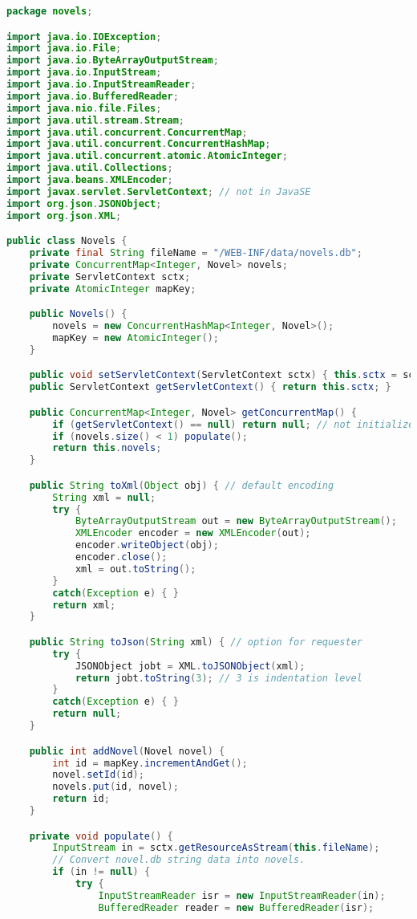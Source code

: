 \documentclass[12pt]{article}
\begin{document}
\begin{lstlisting}[language=java]
package novels;

import java.io.IOException;
import java.io.File;
import java.io.ByteArrayOutputStream;
import java.io.InputStream;
import java.io.InputStreamReader;
import java.io.BufferedReader;
import java.nio.file.Files;
import java.util.stream.Stream;
import java.util.concurrent.ConcurrentMap;
import java.util.concurrent.ConcurrentHashMap;
import java.util.concurrent.atomic.AtomicInteger;
import java.util.Collections;
import java.beans.XMLEncoder;
import javax.servlet.ServletContext; // not in JavaSE
import org.json.JSONObject;
import org.json.XML;

public class Novels {
    private final String fileName = "/WEB-INF/data/novels.db";
    private ConcurrentMap<Integer, Novel> novels;
    private ServletContext sctx;
    private AtomicInteger mapKey;

    public Novels() {
        novels = new ConcurrentHashMap<Integer, Novel>();
        mapKey = new AtomicInteger();
    }

    public void setServletContext(ServletContext sctx) { this.sctx = sctx; }
    public ServletContext getServletContext() { return this.sctx; }

    public ConcurrentMap<Integer, Novel> getConcurrentMap() {
        if (getServletContext() == null) return null; // not initialized
        if (novels.size() < 1) populate();
        return this.novels;
    }

    public String toXml(Object obj) { // default encoding
        String xml = null;
        try {
            ByteArrayOutputStream out = new ByteArrayOutputStream();
            XMLEncoder encoder = new XMLEncoder(out);
            encoder.writeObject(obj);
            encoder.close();
            xml = out.toString();
        }
        catch(Exception e) { }
        return xml;
    }

    public String toJson(String xml) { // option for requester
        try {
            JSONObject jobt = XML.toJSONObject(xml);
            return jobt.toString(3); // 3 is indentation level
        }
        catch(Exception e) { }
        return null;
    }

    public int addNovel(Novel novel) {
        int id = mapKey.incrementAndGet();
        novel.setId(id);
        novels.put(id, novel);
        return id;
    }

    private void populate() {
        InputStream in = sctx.getResourceAsStream(this.fileName);
        // Convert novel.db string data into novels.
        if (in != null) {
            try {
                InputStreamReader isr = new InputStreamReader(in);
                BufferedReader reader = new BufferedReader(isr);


\end{lstlisting}
\end{document}
